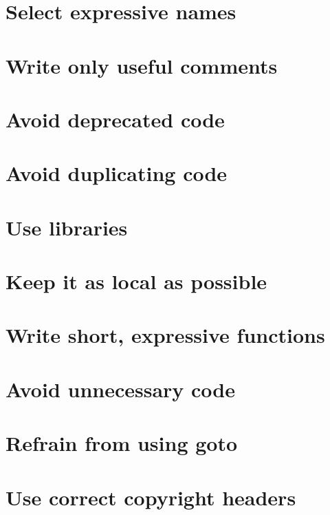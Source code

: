 \documentclass[a4paper,11pt]{scrreprt}
\begin{document}
\section{Select expressive names}
\section{Write only useful comments}
\section{Avoid deprecated code}
\section{Avoid duplicating code}
\section{Use libraries}
\section{Keep it as local as possible}
\section{Write short, expressive functions}
\section{Avoid unnecessary code}
\section{Refrain from using goto}
\section{Use correct copyright headers}
\end{document}
